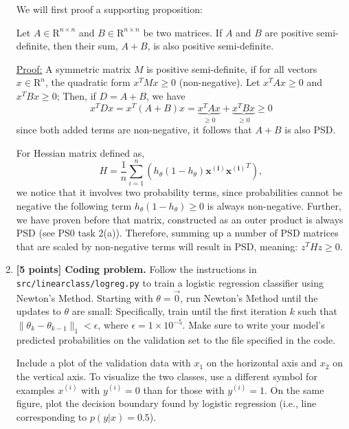 \documentclass{article}
\newcommand{\bl}[1]{\boldsymbol{#1}}
\begin{document}
\begin{enumerate}[label=\alph*)]
We will first proof a supporting proposition:
\begin{tcolorbox}[colback=gray!20!white,colframe=gray!50!black]
 Let $A\in\mathrm{R}^{n\times n}$ and $B\in\mathrm{R}^{n\times n}$ be two  matrices. If $A$ and $B$ are positive semi-definite, then their sum, $A + B$, is also positive semi-definite.

 
\underline{Proof:} A symmetric matrix $M$ is positive semi-definite, if for all vectors $x \in \mathrm{R}^n$, the quadratic form $x^TMx\geq 0$ (non-negative). Let $x^TAx \geq 0$ and $x^TBx \geq 0$; Then, if $D = A + B$, we  have
\[x^TDx = x^T(A + B)x = \underbrace{x^TAx}_{\geq 0} + \underbrace{x^TBx}_{\geq 0}\geq 0 \] 
since both added terms  are non-negative, it follows that $A + B$ is also PSD.
 \end{tcolorbox} 

For Hessian matrix defined as, 
\[
\boxed{H = \frac{1}{n}\sum\limits_{i=1}^{n}\left( h_\theta(1-h_\theta) \bl{x^{(i)}}\bl{x^{(i)}}^T\right ),}
\]
we notice that it involves two probability terms, since probabilities cannot be negative the following term $h_\theta(1-h_\theta)\geq 0$ is always non-negative. Further, we have proven before that matrix, constructed as an outer product is always PSD (see PS0 task 2(a)). Therefore, summing up a number of PSD matrices that are scaled by non-negative terms will result in PSD, meaning: $z^THz\geq 0$.


\item \textbf{[5 points] Coding problem.} Follow the instructions in \texttt{src/linearclass/logreg.py} to train a logistic regression classifier using Newton’s Method. Starting with $\theta = \vec{0}$, run Newton’s Method until the updates to $\theta$ are small: Specifically, train until the first iteration $k$ such that $\|\theta_k - \theta_{k-1}\|_1 < \epsilon$, where $\epsilon = 1 \times 10^{-5}$. Make sure to write your model's predicted probabilities on the validation set to the file specified in the code.

Include a plot of the validation data with $x_1$ on the horizontal axis and $x_2$ on the vertical axis. To visualize the two classes, use a different symbol for examples $x^{(i)}$ with $y^{(i)} = 0$ than for those with $y^{(i)} = 1$. On the same figure, plot the decision boundary found by logistic regression (i.e., line corresponding to $p(y|x) = 0.5$).


\end{enumerate}
\end{document}

